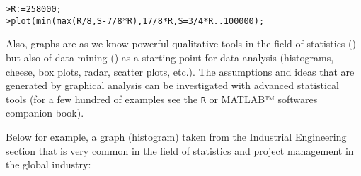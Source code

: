 	\texttt{>R:=258000;}\\
	\texttt{>plot(min(max(R/8,S-7/8*R),17/8*R,S=3/4*R..100000);}

	Also, graphs are as we know powerful qualitative tools in the field of statistics () but also of data mining () as a starting point for data analysis (histograms, cheese, box plots, radar, scatter plots, etc.). The assumptions and ideas that are generated by graphical analysis can be investigated with advanced statistical tools (for a few hundred of examples see the \texttt{R} or MATLAB™ softwares companion book).

	Below for example, a graph (histogram) taken from the Industrial Engineering section that is very common in the field of statistics and project management in the global industry:
